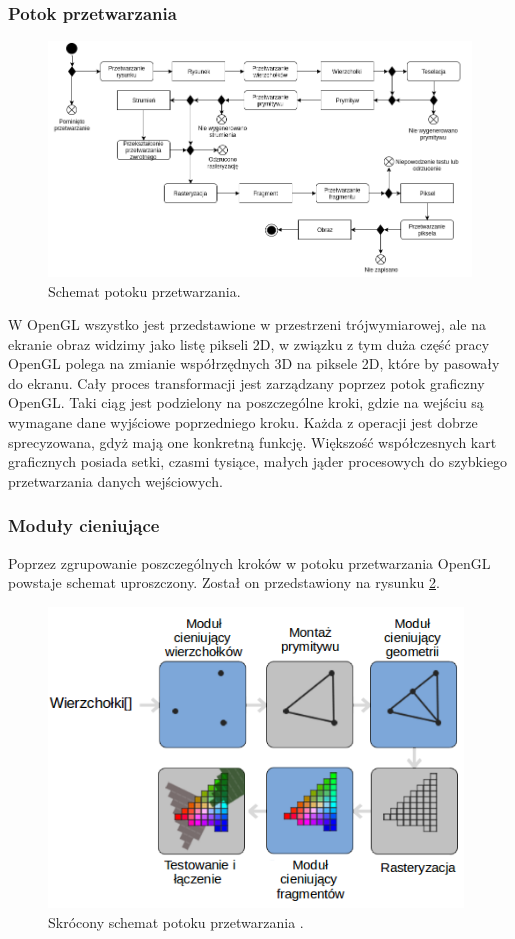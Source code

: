 \subsubsection{Potok przetwarzania}
\begin{figure}[H]
		\centering
 		\includegraphics[width=15.5cm]{OpenGL.png}
    	\caption{Schemat potoku przetwarzania.}
 		\label{rys7}
\end{figure}
W OpenGL wszystko jest przedstawione w przestrzeni trójwymiarowej, ale na ekranie obraz widzimy jako listę pikseli 2D, w związku z tym duża część pracy OpenGL polega na zmianie współrzędnych 3D na piksele 2D, które by pasowały do ekranu. Cały proces transformacji jest zarządzany poprzez potok graficzny OpenGL. Taki ciąg jest podzielony na poszczególne kroki, gdzie na wejściu są wymagane dane wyjściowe poprzedniego kroku. Każda z operacji jest dobrze sprecyzowana, gdyż mają one konkretną funkcję. Większość współczesnych kart graficznych posiada setki, czasmi tysiące, małych jąder procesowych do szybkiego przetwarzania danych wejściowych.

\subsubsection{Moduły cieniujące}
Poprzez zgrupowanie poszczególnych kroków w potoku przetwarzania OpenGL powstaje schemat uproszczony. Został on przedstawiony na rysunku \ref{rys8}.
\begin{figure}[H]
		\centering
 		\includegraphics[width=11cm]{pipeline.png}
    	\caption{Skrócony schemat potoku przetwarzania \cite{opengltutorial}.}
 		\label{rys8}
\end{figure}
 
